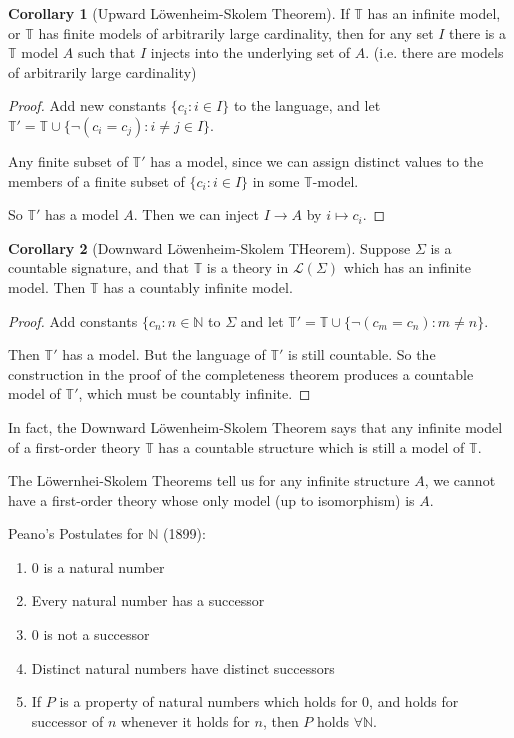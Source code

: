 \documentclass[a4paper]{article}
\theoremstyle{definition}
\newtheorem*{cor}{Corollary}
\newcommand{\N}{\mathbb{N}}
\newcommand{\T}{\mathbb{T}}
\newcommand{\La}{\mathcal{L}}
\begin{document}
\begin{cor}[Upward L\"owenheim-Skolem Theorem]
  If $\T$ has an infinite model, or $\T$ has finite models of arbitrarily large cardinality, then for any set $I$ there is a $\T$ model $A$ such that $I$ injects into the underlying set of $A$. (i.e. there are models of arbitrarily large cardinality)
\end{cor}

\begin{proof}
Add new constants $\{c_i: i\in I\}$ to the language, and let $\T' = \T\cup \{\neg (c_i = c_j): i\not= j\in I\}$.

Any finite subset of $\T'$ has a model, since we can assign distinct values to the members of a finite subset of $\{c_i: i\in I\}$ in some $\T$-model.

So $\T'$ has a model $A$. Then we can inject $I\to A$ by $i\mapsto c_i$.
\end{proof}

\begin{cor}[Downward L\"owenheim-Skolem THeorem]
  Suppose $\Sigma$ is a countable signature, and that $\T$ is a theory in $\La(\Sigma)$ which has an infinite model. Then $\T$ has a countably infinite model.
\end{cor}

\begin{proof}
  Add constants $\{c_n: n\in \N$ to $\Sigma$ and let $\T' = \T\cup\{\neg(c_m = c_n): m\not= n\}$.

  Then $\T'$ has a model.  But the language of $\T'$ is still countable. So the construction in the proof of the completeness theorem produces a countable model of $\T'$, which must be countably infinite.
\end{proof}

In fact, the Downward L\"owenheim-Skolem Theorem says that any infinite model of a first-order theory $\T$ has a countable structure which is still a model of $\T$.

The L\"owernhei-Skolem Theorems tell us for any infinite structure $A$, we cannot have a first-order theory whose only model (up to isomorphism) is $A$.

Peano's Postulates for $\N$ (1899):
\begin{enumerate}
\item 0 is a natural number
\item Every natural number has a successor
\item 0 is not a successor
\item Distinct natural numbers have distinct successors
\item If $P$ is a property of natural numbers which holds for 0, and holds for successor of $n$ whenever it holds for $n$, then $P$ holds $\forall \N$.
\end{enumerate}
\end{document}
